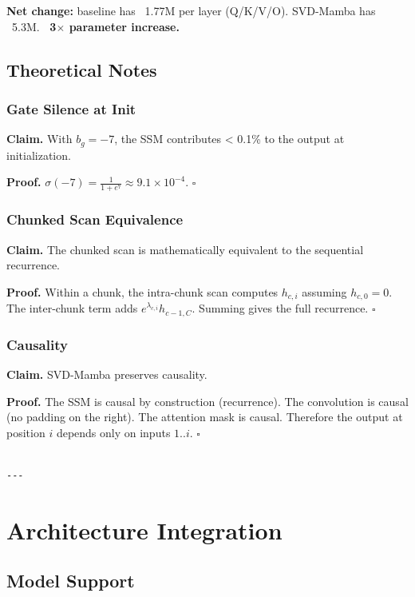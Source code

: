 \textbf{Net change:} baseline has ~1.77M per layer (Q/K/V/O). SVD-Mamba has 
~5.3M. \textbf{~3$\times$ parameter increase.}

\subsection{Theoretical Notes}

\subsubsection{Gate Silence at Init}

\textbf{Claim.} With $b_g = -7$, the SSM contributes \textless{} 0.1\% to the output at 
initialization.

\textbf{Proof.} $\sigma(-7) = \frac{1}{1 + e^7} \approx 9.1 \times 10^{-4}$. $\square$

\subsubsection{Chunked Scan Equivalence}

\textbf{Claim.} The chunked scan is mathematically equivalent to the sequential 
recurrence.

\textbf{Proof.} Within a chunk, the intra-chunk scan computes $h_{c,i}$ assuming 
$h_{c,0} = 0$. The inter-chunk term adds $e^{\lambda_{c,i}} h_{c-1, C}$. 
Summing gives the full recurrence. $\square$

\subsubsection{Causality}

\textbf{Claim.} SVD-Mamba preserves causality.

\textbf{Proof.} The SSM is causal by construction (recurrence). The convolution 
is causal (no padding on the right). The attention mask is causal. Therefore 
the output at position $i$ depends only on inputs $1..i$. $\square$
\begin{lstlisting}

---
\end{lstlisting}


\section{Architecture Integration}

\subsection{Model Support}

